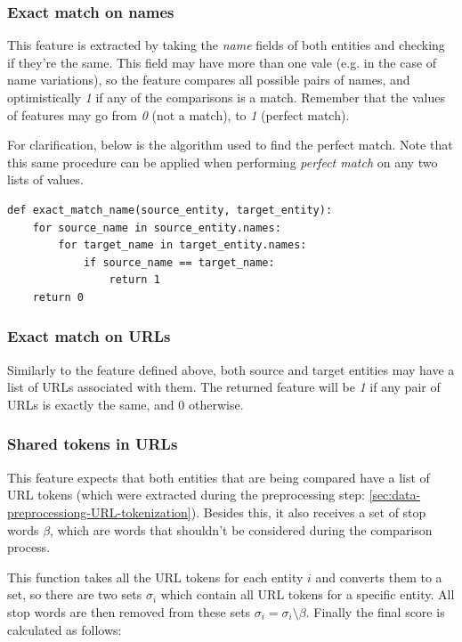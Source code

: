 \documentclass[epsfig,a4paper,11pt,titlepage,twoside,openany]{book}
\begin{document}
\subsubsection{Exact match on names}
\label{sec:feature-exact-match-names}

This feature is extracted by taking the \textit{name} fields of both entities and checking if they're the same. This field may have more than one vale (e.g. in the case of name variations), so the feature compares all possible pairs of names, and optimistically \textit{1} if any of the comparisons is a match. Remember that the values of features may go from \textit{0} (not a match), to \textit{1} (perfect match). 

For clarification, below is the algorithm used to find the perfect match. Note that this same procedure can be applied when performing \textit{perfect match} on any two lists of values.

\begin{lstlisting}
def exact_match_name(source_entity, target_entity):
    for source_name in source_entity.names:
        for target_name in target_entity.names:
            if source_name == target_name:
                return 1
    return 0
\end{lstlisting}


\subsubsection{Exact match on URLs}
\label{sec:feature-exact-match-urls}

Similarly to the feature defined above, both source and target entities may have a list of URLs associated with them. The returned feature will be \textit{1} if any pair of URLs is exactly the same, and 0 otherwise.

\subsubsection{Shared tokens in URLs}
\label{sec:feature-shared-tokens-plus-urls}

This feature expects that both entities that are being compared have a list of URL tokens (which were extracted during the preprocessing step: \autoref{sec:data-preprocessiong-URL-tokenization}). Besides this, it also receives a set of stop words $\beta$, which are words that shouldn't be considered during the comparison process.

This function takes all the URL tokens for each entity $i$ and converts them to a set, so there are two sets $\sigma_i$ which contain all URL tokens for a specific entity. All stop words are then removed from these sets $\sigma_i = \sigma_i \setminus \beta$. Finally the final score is calculated as follows:
\end{document}
